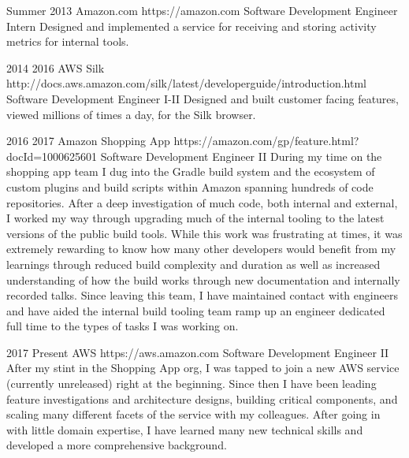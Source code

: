 \job
{Summer 2013} {}
{Amazon.com} {https://amazon.com}
{Software Development Engineer Intern}
{Designed and implemented a service for receiving and storing activity metrics for internal tools.}

\job
{2014} {2016}
{AWS Silk} {http://docs.aws.amazon.com/silk/latest/developerguide/introduction.html}
{Software Development Engineer I-II}
{Designed and built customer facing features, viewed millions of times a day, for the Silk browser.}

\job
{2016} {2017}
{Amazon Shopping App} {https://amazon.com/gp/feature.html?docId=1000625601}
{Software Development Engineer II}
{During my time on the shopping app team I dug into the Gradle build system and the ecosystem of custom plugins and build scripts within Amazon spanning hundreds of code repositories. After a deep investigation of much code, both internal and external, I worked my way through upgrading much of the internal tooling to the latest versions of the public build tools. While this work was frustrating at times, it was extremely rewarding to know how many other developers would benefit from my learnings through reduced build complexity and duration as well as increased understanding of how the build works through new documentation and internally recorded talks. Since leaving this team, I have maintained contact with engineers and have aided the internal build tooling team ramp up an engineer dedicated full time to the types of tasks I was working on.}

\job
{2017} {Present}
{AWS} {https://aws.amazon.com}
{Software Development Engineer II}
{After my stint in the Shopping App org, I was tapped to join a new AWS service (currently unreleased) right at the beginning. Since then I have been leading feature investigations and architecture designs, building critical components, and scaling many different facets of the service with my colleagues. After going in with little domain expertise, I have learned many new technical skills and developed a more comprehensive background.}